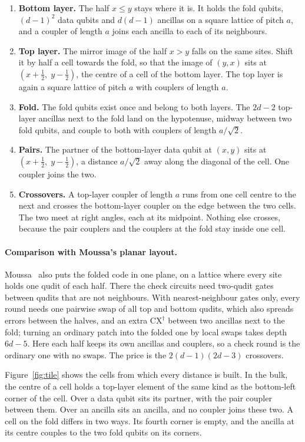 \documentclass[11pt,a4paper]{article}
\begin{document}
\begin{enumerate}
\item \textbf{Bottom layer.} The half $x\le y$ stays where it is. It holds the fold qubits,
$(d-1)^2$ data qubits and $d(d-1)$ ancillas on a square lattice of pitch $a$, and a coupler of
length $a$ joins each ancilla to each of its neighbours.
\item \textbf{Top layer.} The mirror image of the half $x>y$ falls on the same sites. Shift it
by half a cell towards the fold, so that the image of $(y,x)$ sits at
$(x+\tfrac12,\;y-\tfrac12)$, the centre of a cell of the bottom layer. The top layer is again a
square lattice of pitch $a$ with couplers of length $a$.
\item \textbf{Fold.} The fold qubits exist once and belong to both layers. The $2d-2$ top-layer
ancillas next to the fold land on the hypotenuse, midway between two fold qubits, and couple to
both with couplers of length $a/\sqrt2$.
\item \textbf{Pairs.} The partner of the bottom-layer data qubit at $(x,y)$ sits at
$(x+\tfrac12,\;y-\tfrac12)$, a distance $a/\sqrt2$ away along the diagonal of the cell. One
coupler joins the two.
\item \textbf{Crossovers.} A top-layer coupler of length $a$ runs from one cell centre to the
next and crosses the bottom-layer coupler on the edge between the two cells. The two meet at
right angles, each at its midpoint. Nothing else crosses, because the pair couplers and the couplers
at the fold stay inside one cell.
\end{enumerate}

\paragraph{Comparison with Moussa's planar layout.} Moussa~\cite{Moussa2016} also puts the folded
code in one plane, on a lattice where every site holds one qudit of each half. There the check
circuits need two-qudit gates between qudits that are not neighbours. With nearest-neighbour gates
only, every round needs one pairwise swap of all top and bottom qudits, which also spreads errors
between the halves, and an extra $\mathrm{CX}^\dagger$ between two ancillas next to the fold;
turning an ordinary patch into the folded one by local swaps takes depth $6d-5$. Here each half
keeps its own ancillas and couplers, so a check round is the ordinary one with no swaps. The price
is the $2(d-1)(2d-3)$ crossovers.

Figure~\ref{fig:tile} shows the cells from which every distance is built. In the bulk, the
centre of a cell holds a top-layer element of the same kind as the bottom-left corner of the
cell. Over a data qubit sits its partner, with the pair coupler between them. Over an ancilla
sits an ancilla, and no coupler joins these two. A cell on the fold differs in two ways. Its
fourth corner is empty, and the ancilla at its centre couples to the two fold qubits on its
corners.
\end{document}
